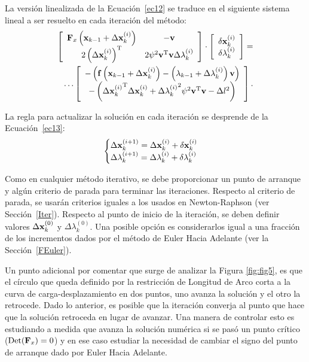La versión linealizada de la Ecuación~\eqref{ec12} se traduce en el siguiente sistema lineal a ser resuelto en cada iteración del método:
%
\begin{eqnarray}\label{ec14}
\left[\begin{array}{cc}
{\bf F}_x\left({\bf x}_{k-1} +\Delta {\bf x}_k^{(i)}\right) & -{\bf v}\\ 
2 \left(\Delta {\bf x}_k^{(i)}\right)^{\text{T}} &  2\psi^2{\bf v}^{\text{T}}{\bf v}\Delta \lambda_k^{(i)} 
\end{array}\right] \cdot 
\left[\begin{array}{c} 
\delta {\bf x}_k^{(i)} \\
\delta \lambda_k^{(i)} 
\end{array}
\right] = \\ 
\dots 
\left[\begin{array}{c}
-\left( {\bf f}\left({\bf x}_{k-1}+\Delta {\bf x}_k^{(i)}\right)- \left(\lambda_{k-1}+\Delta \lambda_k^{(i)}\right) {\bf v} \right)\\
-\left(
    {\Delta {\bf x}_k^{(i)}}^{\text{T}}   \Delta {\bf x}_k^{(i)} 
  + {\Delta \lambda_k^{(i)}}^2 \psi^2 {\bf v}^{\text{T}}{\bf v} - \Delta l^2
\right)
\end{array}\right].
\end{eqnarray}

La regla para actualizar la solución en cada iteración se desprende de la Ecuación~\eqref{ec13}:
%
\begin{equation}\label{ec15}
\begin{cases}
	\Delta {\bf x}_k^{(i+1)}=\Delta {\bf x}_k^{(i)} + \delta {\bf x}_k^{(i)}\\
	\Delta \lambda_k^{(i+1)}=\Delta \lambda_k^{(i)}+\delta \lambda_k^{(i)}
\end{cases}
\end{equation}

Como en cualquier método iterativo, se debe proporcionar un punto de arranque y algún criterio de parada para terminar las iteraciones. %
%
Respecto al criterio de parada, se usarán criterios iguales a los usados en Newton-Raphson (ver Sección~\ref{Iter}). %
%
Respecto al punto de inicio de la iteración, se deben definir valores $\Delta {\bf x}_k^{(0)}$ y $\Delta \lambda_k^{(0)}$. %
%
Una posible opción es considerarlos igual a una fracción de los incrementos dados por el método de Euler Hacia Adelante (ver la Sección~\ref{FEuler}).

Un punto adicional por comentar que surge de analizar la Figura \ref{fig:fig5}, es que el círculo que queda definido por la restricción de Longitud de Arco corta a la curva de carga-desplazamiento en dos puntos, uno avanza la solución y el otro la retrocede. Dado lo anterior, es posible que la iteración converja al punto que hace que la solución retroceda en lugar de avanzar. Una manera de controlar esto es estudiando a medida que avanza la solución numérica si se pasó un punto crítico ($\text{Det}({\bf F}_x)=0$) y en ese caso estudiar la necesidad de cambiar el signo del punto de arranque dado por Euler Hacia Adelante.

